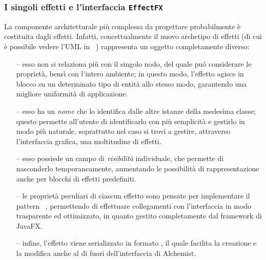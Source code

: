             \subsubsection{I singoli effetti e l'interfaccia \texttt{EffectFX}}\label{subsubsec:effectFX}
                La componente architetturale più complessa da progettare probabilmente è costituita dagli effetti.
                Infatti, concettualmente il nuovo archetipo di effetti (di cui è possibile vedere l'UML in~%
                ) rappresenta un oggetto completamente diverso:

                \begin{itemize}
                    \item[--]\label{itm:eFXEnv}
                        esso non si relaziona più con il singolo nodo, del quale può considerare le proprietà, bensì con l'intero ambiente;
                        in questo modo, l'effetto agisce in blocco su un determinato tipo di entità allo stesso modo, garantendo una migliore uniformità di applicazione.

                    \item[--]\label{itm:eFXName}
                        esso ha un \emph{nome} che lo identifica dalle altre istanze della medesima classe;
                        questo permette all'utente di identificarlo con più semplicità e gestirlo in modo più naturale, soprattutto nel caso si trovi a gestire, attraverso l'interfaccia grafica, una moltitudine di effetti.

                    \item[--]\label{itm:eFXVis}
                        esso possiede un campo di \emph{visibilità} individuale, che permette di nasconderlo temporaneamente, aumentando le possibilità di rappresentazione anche per blocchi di effetti predefiniti.

                    \item[--]\label{itm:eFXobservable}
                        le proprietà peculiari di ciascun effetto sono pensate per implementare il pattern ~\cite{observer}, permettendo di effettuare collegamenti con l'interfaccia in modo trasparente ed ottimizzato, in quanto gestito completamente dal framework di JavaFX.

                    \item[--]\label{itm:eFXjson}
                        infine, l'effetto viene serializzato in formato , il quale facilita la creazione e la modifica anche al di fuori dell'interfaccia di Alchemist.


\end{itemize}
